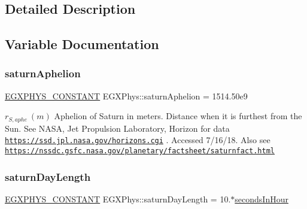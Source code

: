 \subsection{Detailed Description}


\subsection{Variable Documentation}
\mbox{\label{group___e_g_x_phys-_constants-_astrophysics-_solar_system-_saturn-_orbit_ga666001ca670abba0d7d1af6b8efd4828}} 
\subsubsection{\texorpdfstring{saturn\+Aphelion}{saturnAphelion}}
{\footnotesize\ttfamily \mbox{\hyperlink{group___e_g_x_phys-_constants-_macros_ga76980d288494ce1714c9ac68a95ba702}{E\+G\+X\+P\+H\+Y\+S\+\_\+\+C\+O\+N\+S\+T\+A\+NT}} E\+G\+X\+Phys\+::saturn\+Aphelion = 1514.\+50e9}

$ r_{S,aphe} \ (m)$ Aphelion of Saturn in meters. Distance when it is furthest from the Sun. See N\+A\+SA, Jet Propulsion Laboratory, Horizon for data \href{https://ssd.jpl.nasa.gov/horizons.cgi}{\tt https\+://ssd.\+jpl.\+nasa.\+gov/horizons.\+cgi} . Accessed 7/16/18. Also see \href{https://nssdc.gsfc.nasa.gov/planetary/factsheet/saturnfact.html}{\tt https\+://nssdc.\+gsfc.\+nasa.\+gov/planetary/factsheet/saturnfact.\+html} \mbox{\label{group___e_g_x_phys-_constants-_astrophysics-_solar_system-_saturn-_orbit_ga9a4ae1811e01d43c9abc0b14a49eebbd}} 
\subsubsection{\texorpdfstring{saturn\+Day\+Length}{saturnDayLength}}
{\footnotesize\ttfamily \mbox{\hyperlink{group___e_g_x_phys-_constants-_macros_ga76980d288494ce1714c9ac68a95ba702}{E\+G\+X\+P\+H\+Y\+S\+\_\+\+C\+O\+N\+S\+T\+A\+NT}} E\+G\+X\+Phys\+::saturn\+Day\+Length = 10.$\ast$\mbox{\hyperlink{namespace_e_g_x_phys_a7c3165cd93e36f1fb8e9fef80f117bef}{seconds\+In\+Hour}}}

